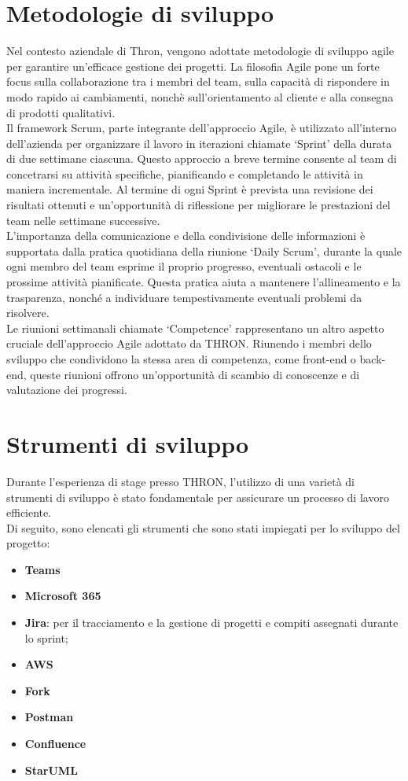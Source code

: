 \section{Metodologie di sviluppo}
Nel contesto aziendale di Thron, vengono adottate metodologie di sviluppo agile per garantire un'efficace
gestione dei progetti. La filosofia Agile pone un forte focus sulla collaborazione tra i membri del team,
sulla capacità di rispondere in modo rapido ai cambiamenti, nonchè sull'orientamento al cliente e alla consegna di prodotti qualitativi.\\
Il framework Scrum, parte integrante dell'approccio Agile, è utilizzato all'interno dell'azienda per organizzare il lavoro in iterazioni chiamate
`Sprint' della durata di due settimane ciascuna. Questo approccio a breve termine consente al team di concetrarsi su attività specifiche, pianificando
e completando le attività in maniera incrementale. Al termine di ogni Sprint è prevista una revisione dei risultati ottenuti e un'opportunità 
di riflessione per migliorare le prestazioni del team nelle settimane successive.\\
L'importanza della comunicazione e della condivisione delle informazioni è supportata dalla pratica quotidiana della riunione `Daily Scrum', durante la quale
ogni membro del team esprime il proprio progresso, eventuali ostacoli e le prossime attività pianificate. Questa pratica aiuta a mantenere l'allineamento e
la trasparenza, nonché a individuare tempestivamente eventuali problemi da risolvere.\\
Le riunioni settimanali chiamate `Competence' rappresentano un altro aspetto cruciale dell'approccio Agile adottato da THRON. Riunendo i membri dello sviluppo 
che condividono la stessa area di competenza, come front-end o back-end, queste riunioni offrono un'opportunità di scambio di conoscenze e di valutazione dei progressi.

\section{Strumenti di sviluppo}
Durante l'esperienza di stage presso THRON, l'utilizzo di una varietà di strumenti di sviluppo è stato fondamentale per assicurare un processo di lavoro efficiente.\\
Di seguito, sono elencati gli strumenti che sono stati impiegati per lo sviluppo del progetto:

\begin{itemize}
  \item \textbf{Teams}
  \item \textbf{Microsoft 365}
  \item \textbf{Jira}: per il tracciamento e la gestione di progetti e compiti assegnati durante lo sprint;
  \item \textbf{AWS}
  \item \textbf{Fork}
  \item \textbf{Postman}
  \item \textbf{Confluence}
  \item \textbf{StarUML}
\end{itemize}

